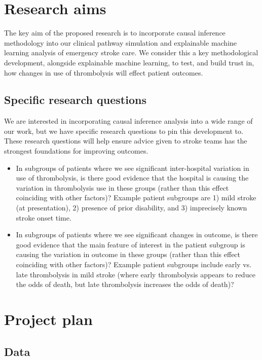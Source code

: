 \section{Research aims}

The key aim of the proposed research is to incorporate causal inference methodology into our clinical pathway simulation and explainable machine learning analysis of emergency stroke care. We consider this a key methodological development, alongside explainable machine learning, to test, and build trust in, how changes in use of thrombolysis will effect patient outcomes.

\subsection{Specific research questions}

We are interested in incorporating causal inference analysis into a wide range of our work, but we have specific research questions to pin this development to. These research questions will help ensure advice given to stroke teams has the strongest foundations for improving outcomes.

\begin{itemize}
    \item In subgroups of patients where we see significant inter-hospital variation in use of thrombolysis, is there good evidence that the hospital is causing the variation in thrombolysis use in these groups (rather than this effect coinciding with other factors)? Example patient subgroups are 1) mild stroke (at presentation), 2) presence of prior disability, and 3) imprecisely known stroke onset time.

    \item In subgroups of patients where we see significant changes in outcome, is there good evidence that the main feature of interest in the patient subgroup is causing the variation in outcome in these groups (rather than this effect coinciding with other factors)? Example patient subgroups include early vs. late thrombolysis in mild stroke (where early thrombolysis appears to reduce the odds of death, but late thrombolysis increases the odds of death)?
\end{itemize}


\section{Project plan}

\subsection{Data}

